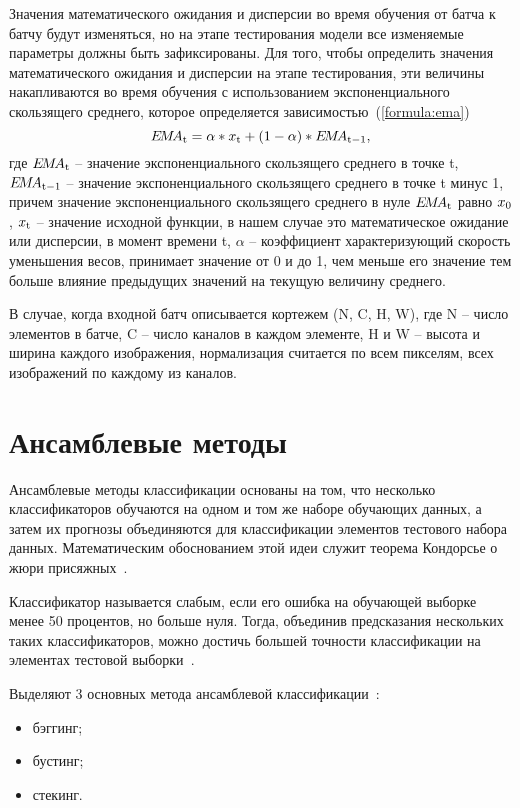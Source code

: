 Значения математического ожидания и дисперсии во время обучения от батча к батчу будут изменяться, но на этапе тестирования модели все изменяемые параметры должны быть зафиксированы. Для того, чтобы определить значения математического ожидания и дисперсии на этапе тестирования, эти величины накапливаются во время обучения с использованием экспоненциального скользящего среднего, которое определяется зависимостью~(\ref{formula:ema}) \begin{equation}\label{formula:ema}
E\!M\!A_{\rm{t}} = \alpha * x_{\rm{t}} + (1 - \alpha) * E\!M\!A_{\rm{t-1}},
\end{equation}
где $E\!M\!A_{\rm{t}}$ -- значение экспоненциального скользящего среднего в точке t, $E\!M\!A_{\rm{t-1}}$ -- значение экспоненциального скользящего среднего в точке t минус 1, причем значение экспоненциального скользящего среднего в нуле $E\!M\!A_{\rm{t}}$ равно $x_{\rm{0}}$, $x_{\rm{t}}$ -- значение исходной функции, в нашем случае это математическое ожидание или дисперсии, в момент времени t, $\alpha$ -- коэффициент характеризующий скорость уменьшения весов, принимает значение от 0 и до 1, чем меньше его значение тем больше влияние предыдущих значений на текущую величину среднего.

В случае, когда входной батч описывается кортежем (N, C, H, W), где N -- число элементов в батче, C -- число каналов в каждом элементе, H и W -- высота и ширина каждого изображения, нормализация считается по всем пикселям, всех изображений по каждому из каналов.

\section{Ансамблевые методы}
Ансамблевые методы классификации основаны на том, что несколько классификаторов обучаются на одном и том же наборе обучающих данных, а затем их прогнозы объединяются для классификации элементов тестового набора данных. Математическим обоснованием этой идеи служит теорема Кондорсье о жюри присяжных~\cite{ansambles}.

Классификатор называется слабым, если его ошибка на обучающей выборке менее 50 процентов, но больше нуля. Тогда, объединив предсказания нескольких таких классификаторов, можно достичь большей точности классификации на элементах тестовой выборки~\cite{ansambles}.

Выделяют 3 основных метода ансамблевой классификации~\cite{ansambles}:
\begin{itemize}
	\item бэггинг;
	\item бустинг;
	\item стекинг.
\end{itemize}

